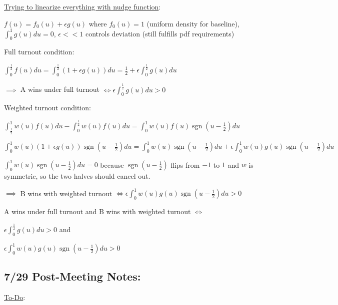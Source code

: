 \documentclass[12pt]{article}
\begin{document}
\underline{Trying to linearize everything with nudge function}:

$f(u) = f_0(u) + \epsilon g(u)$ where $f_0(u) = 1$ (uniform density for baseline), $\int_0^1 g(u) du = 0$, $\epsilon < < 1$ controls deviation (still fulfills pdf requirements)

Full turnout condition:

$\int_0^\frac{1}{2} f(u)du = \int_0^\frac{1}{2} (1 + \epsilon g(u)) du = \frac{1}{2} + \epsilon \int_0^\frac{1}{2}g(u)du$

$\implies$ A wins under full turnout $\iff \epsilon \int_0^\frac{1}{2}g(u)du > 0$

Weighted turnout condition:

$\int_\frac{1}{2}^1w(u)f(u)du - \int_0^\frac{1}{2}w(u)f(u)du = \int_0^1w(u)f(u)\operatorname{sgn}(u - \frac{1}{2})du$

$\int_0^1w(u)(1 + \epsilon g(u))\operatorname{sgn}(u - \frac{1}{2})du = \int_0^1w(u)\operatorname{sgn}(u - \frac{1}{2})du + \epsilon \int_0^1w(u)g(u)\operatorname{sgn}(u - \frac{1}{2})du$

$\int_0^1w(u)\operatorname{sgn}(u - \frac{1}{2})du = 0$ because $\operatorname{sgn}(u - \frac{1}{2})$ flips from $-1$ to $1$ and $w$ is symmetric, so the two halves should cancel out.

$\implies$ B wins with weighted turnout $\iff \epsilon\int_0^1w(u)g(u)\operatorname{sgn}(u - \frac{1}{2})du > 0$

A wins under full turnout and B wins with weighted turnout $\iff$
\begin{description}[nolistsep]
    \item[\normalfont Constraint 1:] $\epsilon \int_0^\frac{1}{2}g(u)du > 0$ and
    \item[\normalfont Constraint 2:] $\epsilon\int_0^1w(u)g(u)\operatorname{sgn}(u - \frac{1}{2})du > 0$
\end{description}


\subsection*{7/29 Post-Meeting Notes:}

\underline{To-Do}:
\end{document}

